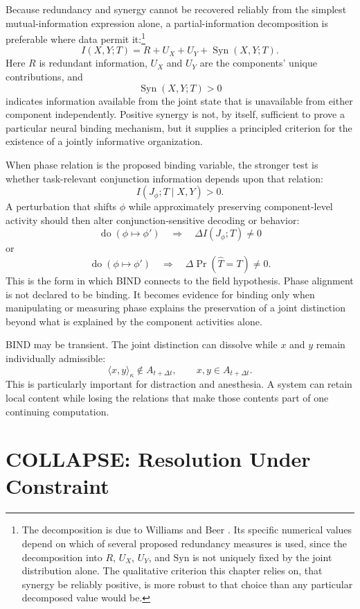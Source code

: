 \documentclass[11pt]{book}
\begin{document}
Because redundancy and synergy cannot be recovered reliably from the simplest mutual-information expression alone, a partial-information decomposition is preferable where data permit it:\footnote{The decomposition is due to Williams and Beer \cite{williams2010}. Its specific numerical values depend on which of several proposed redundancy measures is used, since the decomposition into $R$, $U_X$, $U_Y$, and $\mathrm{Syn}$ is not uniquely fixed by the joint distribution alone. The qualitative criterion this chapter relies on, that synergy be reliably positive, is more robust to that choice than any particular decomposed value would be.}
\[
I(X,Y;T)
=
R+U_X+U_Y+\operatorname{Syn}(X,Y;T).
\]
Here $R$ is redundant information, $U_X$ and $U_Y$ are the components' unique contributions, and
\[
\operatorname{Syn}(X,Y;T)>0
\]
indicates information available from the joint state that is unavailable from either component independently. Positive synergy is not, by itself, sufficient to prove a particular neural binding mechanism, but it supplies a principled criterion for the existence of a jointly informative organization.

When phase relation is the proposed binding variable, the stronger test is whether task-relevant conjunction information depends upon that relation:
\[
I(J_{\phi};T\mid X,Y)>0.
\]
A perturbation that shifts $\phi$ while approximately preserving component-level activity should then alter conjunction-sensitive decoding or behavior:
\[
\operatorname{do}(\phi\mapsto\phi')
\quad\Rightarrow\quad
\Delta I(J_{\phi};T)\neq 0
\]
or
\[
\operatorname{do}(\phi\mapsto\phi')
\quad\Rightarrow\quad
\Delta\Pr(\widehat T=T)\neq 0.
\]
This is the form in which BIND connects to the field hypothesis. Phase alignment is not declared to be binding. It becomes evidence for binding only when manipulating or measuring phase explains the preservation of a joint distinction beyond what is explained by the component activities alone.

BIND may be transient. The joint distinction can dissolve while $x$ and $y$ remain individually admissible:
\[
\langle x,y\rangle_{\kappa}\notin A_{t+\Delta t},
\qquad
x,y\in A_{t+\Delta t}.
\]
This is particularly important for distraction and anesthesia. A system can retain local content while losing the relations that make those contents part of one continuing computation.

\section*{COLLAPSE: Resolution Under Constraint}
\end{document}
